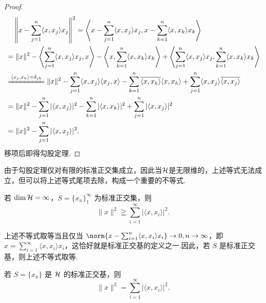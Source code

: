 \begin{proof}
    \allowdisplaybreaks
    \begin{align*}
        & \quad\left\| x - \sum_{j=1}^n \langle x, x_j \rangle x_j \right\|^2 = \left\langle x - \sum_{j=1}^n \langle x, x_j \rangle x_j, x - \sum_{k=1}^n \langle x, x_k \rangle x_k \right\rangle \\
        &= \|x\|^2 - \left\langle \sum_{j=1}^n \langle x, x_j \rangle x_j, x \right\rangle - \left\langle x, \sum_{k=1}^n \langle x, x_k \rangle x_k \right\rangle + \left\langle \sum_{j=1}^n \langle x, x_j \rangle x_j, \sum_{k=1}^n \langle x, x_k \rangle x_k \right\rangle \\
        &\xlongequal{\langle x_j, x_k \rangle = \delta_{jk}} \|x\|^2 - \sum_{j=1}^n \langle x, x_j \rangle \langle x_j, x \rangle - \sum_{k=1}^n \overline{\langle x, x_k \rangle} \langle x, x_k \rangle + \sum_{j=1}^n \langle x, x_j \rangle \overline{\langle x, x_j \rangle} \\
        &= \|x\|^2 - \sum_{j=1}^n |\langle x, x_j \rangle|^2 - \sum_{k=1}^n |\langle x, x_k \rangle|^2 + \sum_{j=1}^n |\langle x, x_j \rangle|^2 \\
        &= \|x\|^2 - \sum_{j=1}^n |\langle x, x_j \rangle|^2. 
    \end{align*}
    移项后即得勾股定理.
\end{proof}

由于勾股定理仅对有限的标准正交集成立，因此当$\mathcal{H}$是无限维的，上述等式无法成立，但可以将上述等式尾项去除，构成一个重要的不等式.

\begin{corollary}
    若 $\dim \mathcal{H} = \infty$，$S = \{x_n\}_1^\infty$ 为标准正交集，则
    \[
        \|x\|^2 \geqq \sum_{i=1}^\infty |\langle x, x_i \rangle|^2.
    \]
\end{corollary}

上述不等式取等当且仅当 $\norm{x - \sum_{i=1}^n \langle x, x_i \rangle x_i}\to 0,n \to \infty$，即 $x = \sum_{i=1}^\infty \langle x, x_i \rangle x_i$，这恰好就是标准正交基的定义之一.因此，若 $S$ 是标准正交基，则上述不等式取等.
\begin{corollary}[Parseval 等式]
    若 $S = \{x_n\}$ 是 $\mathcal{H}$ 的标准正交基，则
    \[
        \|x\|^2 = \sum_{i=1}^\infty |\langle x, x_i \rangle|^2.
    \]
\end{corollary}

